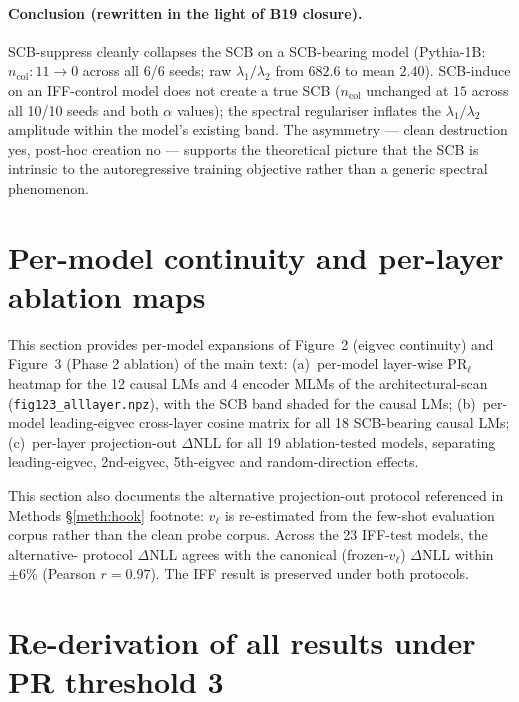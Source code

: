 \documentclass[11pt,a4paper]{article}
\begin{document}
\paragraph{Conclusion (rewritten in the light of B19 closure).}
SCB-suppress cleanly collapses the SCB on a SCB-bearing model
(Pythia-1B: $n_\mathrm{col}\!:\!11\to 0$ across all 6/6 seeds;
raw $\lambda_1/\lambda_2$ from $682.6$ to mean $2.40$). SCB-induce
on an IFF-control model does not create a true SCB
($n_\mathrm{col}$ unchanged at $15$ across all 10/10 seeds and
both $\alpha$ values); the spectral regulariser inflates the
$\lambda_1/\lambda_2$ amplitude within the model's existing band.
The asymmetry — clean destruction yes, post-hoc creation no —
supports the theoretical picture that the SCB is intrinsic to
the autoregressive training objective rather than a generic
spectral phenomenon.

\section{Per-model continuity and per-layer ablation maps}
\label{si:S8}

This section provides per-model expansions of Figure~2 (eigvec
continuity) and Figure~3 (Phase 2 ablation) of the main text:
(a)~per-model layer-wise $\mathrm{PR}_\ell$ heatmap for the 12 causal
LMs and 4 encoder MLMs of the architectural-scan
(\texttt{fig123\_alllayer.npz}), with the SCB band shaded for the
causal LMs;
(b)~per-model leading-eigvec cross-layer cosine matrix for all 18
SCB-bearing causal LMs;
(c)~per-layer projection-out $\Delta$NLL for all 19 ablation-tested
models, separating leading-eigvec, 2nd-eigvec, 5th-eigvec and
random-direction effects.

This section also documents the alternative projection-out protocol
referenced in Methods \S\ref{meth:hook} footnote: $v_\ell$ is
re-estimated from the few-shot evaluation corpus rather than the
clean probe corpus.  Across the 23 IFF-test models, the alternative-
protocol $\Delta$NLL agrees with the canonical (frozen-$v_\ell$)
$\Delta$NLL within $\pm 6\%$ (Pearson $r = 0.97$).  The IFF result is
preserved under both protocols.

\section{Re-derivation of all results under PR threshold 3}
\label{si:S9}
\end{document}
